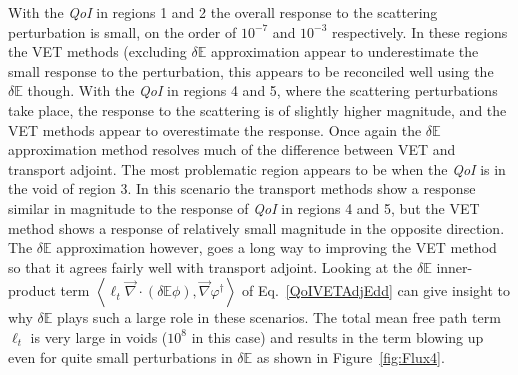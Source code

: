 \documentclass[12pt]{report}
\newcommand{\bra}{\left\langle}
\newcommand{\ket}{\right\rangle}
\renewcommand{\div}{\vec{\nabla} \cdot}
\newcommand{\grad}{\vec{\nabla}}
\newcommand{\vefadj}{\varphi^\dag}
\newcommand{\Edd}{\mathbb{E}}
\newcommand{\isigt}{\ell_t}
\newcommand{\qoi}{{\it QoI}\xspace}
\begin{document}
With the \qoi in regions 1 and 2 the overall response to the scattering perturbation is small, on the order of $10^{-7}$ and $10^{-3}$ respectively. In these regions the VET methods (excluding $\delta \Edd$ approximation appear to underestimate the small response to the perturbation, this appears to be reconciled well using the $\delta \Edd$ though. With the \qoi in regions 4 and 5, where the scattering perturbations take place, the response to the scattering is of slightly higher magnitude, and the VET methods appear to overestimate the response. Once again the $\delta \Edd$ approximation method resolves much of the difference between VET and transport adjoint. The most problematic region appears to be when the \qoi is in the void of region 3. In this scenario the transport methods show a response similar in magnitude to the response of \qoi in regions 4 and 5, but the VET method shows a response of relatively small magnitude in the opposite direction. The $\delta \Edd$ approximation however, goes a long way to improving the VET method so that it agrees fairly well with transport adjoint. Looking at the $\delta \Edd$ inner-product term $ \bra  \isigt \div \left( \delta \Edd \phi \right), \grad \vefadj \ket$ of Eq.~\eqref{QoIVETAdjEdd} can give insight to why $\delta \Edd$ plays such a large role in these scenarios. The total mean free path term $\isigt$ is very large in voids ($10^8$ in this case) and results in the term blowing up even for quite small perturbations in $\delta \Edd$ as shown in Figure~\ref{fig:Flux4}.
\end{document}
